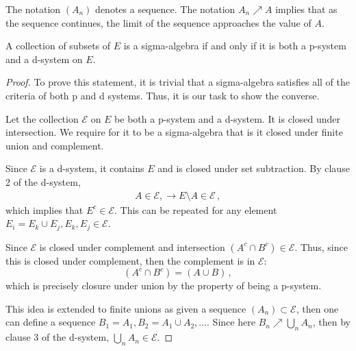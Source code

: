 The notation $(A_n)$ denotes a sequence. The notation $A_n \nearrow A$ implies that as the sequence continues, the limit of the sequence approaches the value of $A$. 

\begin{definition}
	A collection of subsets of $E$ is a sigma-algebra if and only if it is both a p-system and a d-system on $E$.
	\begin{proof}
		To prove this statement, it is trivial that a sigma-algebra satisfies all of the criteria of both p and d systems. Thus, it is our task to show the converse.

		Let the collection $\mathcal{E}$ on $E$ be both a p-system and a d-system. It is closed under intersection. We require for it to be a sigma-algebra that is it closed under finite union and complement. 
		
		Since $\mathcal{E}$ is a d-system, it contains $E$ and is closed under set subtraction. By clause 2 of the d-system, 
		\begin{align*}
			A \in \mathcal{E}, \rightarrow E\setminus A \in \mathcal{E}\,,
		\end{align*}
		which implies that $E^c \in \mathcal{E}$. This can be repeated for any element $E_i = E_k \cup E_j, E_k, E_j \in \mathcal{E}$. 
		
		Since $\mathcal{E}$ is closed under complement and intersection $(A^c \cap B^c) \in \mathcal{E}$. Thus, since this is closed under complement, then the complement is in $\mathcal{E}$:
		\begin{equation}
			(A^c \cap B^c) = (A \cup B)\,,
		\end{equation}
		which is precisely closure under union by the property of being a p-system.

		This idea is extended to finite unions as given a sequence $(A_n) \subset \mathcal{E}$, then one can define a sequence $B_1 = A_1, B_2 = A_1 \cup A_2, \dots$. Since here $B_n \nearrow \bigcup_n A_n$, then by clause 3 of the d-system, $\bigcup_n A_n \in \mathcal{E}$.
	\end{proof}
\end{definition}
\fullpageboxline



